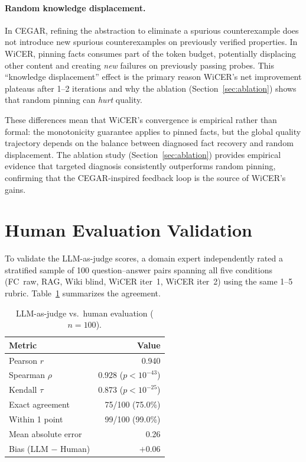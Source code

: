 \documentclass{article}
\begin{document}
\paragraph{Random knowledge displacement.}
In CEGAR, refining the abstraction to eliminate a spurious counterexample
does not introduce new spurious counterexamples on previously verified
properties. In WiCER, pinning facts consumes part of the token budget,
potentially displacing other content and creating \emph{new} failures on
previously passing probes. This ``knowledge displacement'' effect is the
primary reason WiCER's net improvement plateaus after 1--2 iterations
and why the ablation (Section~\ref{sec:ablation}) shows that random
pinning can \emph{hurt} quality.

\medskip
\noindent These differences mean that WiCER's convergence is empirical
rather than formal: the monotonicity guarantee applies to pinned facts,
but the global quality trajectory depends on the balance between
diagnosed fact recovery and random displacement. The ablation study
(Section~\ref{sec:ablation}) provides empirical evidence that targeted
diagnosis consistently outperforms random pinning, confirming that the
CEGAR-inspired feedback loop is the source of WiCER's gains.

\section{Human Evaluation Validation}
\label{app:human_eval}

To validate the LLM-as-judge scores, a domain expert independently rated
a stratified sample of 100 question--answer pairs spanning all five
conditions (FC~raw, RAG, Wiki blind, WiCER iter~1, WiCER iter~2) using
the same 1--5 rubric. Table~\ref{tab:human_corr} summarizes the
agreement.

\begin{table}[h]
\centering
\caption{LLM-as-judge vs.\ human evaluation ($n=100$).}
\label{tab:human_corr}
\small
\begin{tabular}{lr}
\toprule
\textbf{Metric} & \textbf{Value} \\
\midrule
Pearson $r$           & 0.940 \\
Spearman $\rho$       & 0.928 ($p < 10^{-43}$) \\
Kendall $\tau$        & 0.873 ($p < 10^{-25}$) \\
Exact agreement       & 75/100 (75.0\%) \\
Within 1 point        & 99/100 (99.0\%) \\
Mean absolute error   & 0.26 \\
Bias (LLM $-$ Human)  & $+0.06$ \\
\bottomrule
\end{tabular}
\end{table}
\end{document}
